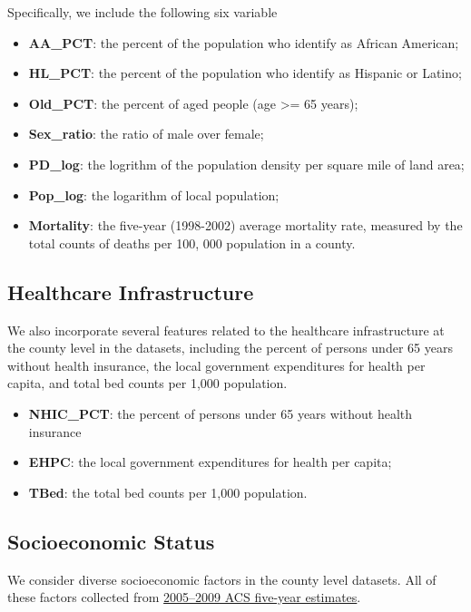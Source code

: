 \documentclass[]{book}
\begin{document}
Specifically, we include the following six variable

\begin{itemize}
\item
  \textbf{AA\_PCT}: the percent of the population who identify as
  African American;
\item
  \textbf{HL\_PCT}: the percent of the population who identify as
  Hispanic or Latino;
\item
  \textbf{Old\_PCT}: the percent of aged people (age \textgreater{}= 65
  years);
\item
  \textbf{Sex\_ratio}: the ratio of male over female;
\item
  \textbf{PD\_log}: the logrithm of the population density per square
  mile of land area;
\item
  \textbf{Pop\_log}: the logarithm of local population;
\item
  \textbf{Mortality}: the five-year (1998-2002) average mortality rate,
  measured by the total counts of deaths per 100, 000 population in a
  county.
\end{itemize}

\subsection{Healthcare Infrastructure}\label{healthcare-infrastructure}

We also incorporate several features related to the healthcare
infrastructure at the county level in the datasets, including the
percent of persons under 65 years without health insurance, the local
government expenditures for health per capita, and total bed counts per
1,000 population.

\begin{itemize}
\item
  \textbf{NHIC\_PCT}: the percent of persons under 65 years without
  health insurance
\item
  \textbf{EHPC}: the local government expenditures for health per
  capita;
\item
  \textbf{TBed}: the total bed counts per 1,000 population.
\end{itemize}

\subsection{Socioeconomic Status}\label{socioeconomic-status}

We consider diverse socioeconomic factors in the county level datasets.
All of these factors collected from
\href{https://data.census.gov/cedsci/table?q=gini\%20coefficient\&hidePreview=false\&tid=ACSDT1Y2018.B19083\&vintage=2018}{2005--2009
ACS five-year estimates}.
\end{document}
